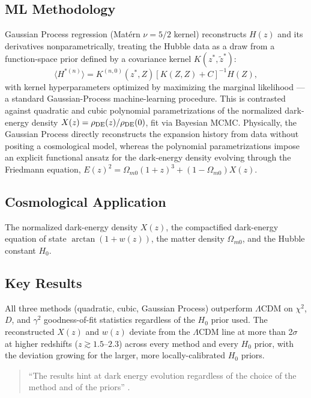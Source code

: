 \documentclass[11pt]{article}
\begin{document}
\subsection{ML Methodology}
Gaussian Process regression (Matérn $\nu=5/2$ kernel) reconstructs $H(z)$ and its derivatives nonparametrically, treating the Hubble data as a draw from a function-space prior defined by a covariance kernel $K(z^*,\tilde z^*)$:
\begin{equation}
\langle H^{*(n)}\rangle = K^{(n,0)}(z^*,Z)\left[K(Z,Z)+C\right]^{-1}H(Z),
\end{equation}
with kernel hyperparameters optimized by maximizing the marginal likelihood — a standard Gaussian-Process machine-learning procedure. This is contrasted against quadratic and cubic polynomial parametrizations of the normalized dark-energy density $X(z)=\rho_{\rm DE}(z)/\rho_{\rm DE}(0)$, fit via Bayesian MCMC. Physically, the Gaussian Process directly reconstructs the expansion history from data without positing a cosmological model, whereas the polynomial parametrizations impose an explicit functional ansatz for the dark-energy density evolving through the Friedmann equation, $E(z)^2=\Omega_{m0}(1+z)^3+(1-\Omega_{m0})X(z)$.

\subsection{Cosmological Application}
The normalized dark-energy density $X(z)$, the compactified dark-energy equation of state $\arctan(1+w(z))$, the matter density $\Omega_{m0}$, and the Hubble constant $H_0$.

\subsection{Key Results}
All three methods (quadratic, cubic, Gaussian Process) outperform $\Lambda$CDM on $\chi^2$, $D$, and $\gamma^2$ goodness-of-fit statistics regardless of the $H_0$ prior used. The reconstructed $X(z)$ and $w(z)$ deviate from the $\Lambda$CDM line at more than 2$\sigma$ at higher redshifts ($z\gtrsim1.5$--$2.3$) across every method and every $H_0$ prior, with the deviation growing for the larger, more locally-calibrated $H_0$ priors.

\begin{quote}
\enquote{The results hint at dark energy evolution regardless of the choice of the method and of the priors} \citep[p.~1]{bernardo2022parametric}.
\end{quote}
\end{document}
